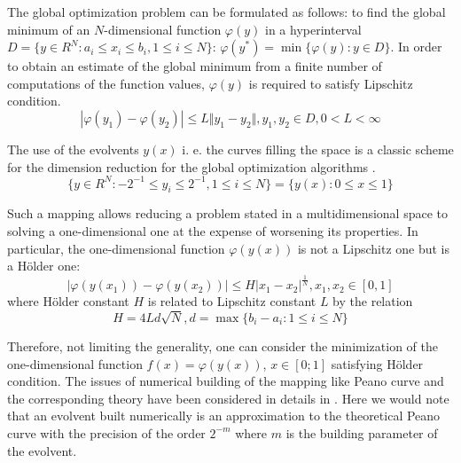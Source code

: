 \documentclass[procedia]{easychair}
\begin{document}
The global optimization problem can be formulated as follows:
to find the global minimum of an \(N\)-dimensional function \(\varphi(y)\) in a hyperinterval
\(D=\{y\in R^N:a_i\leqslant x_i\leqslant{b_i}, 1\leqslant{i}\leqslant{N}\}\): \(\varphi(y^*)=\min\{\varphi(y):y\in D\}\).
In order to obtain an estimate of the global minimum from a finite number of computations
of the function values, \(\varphi(y)\) is required to satisfy Lipschitz condition.
\begin{displaymath}
\label{lip}
|\varphi(y_1)-\varphi(y_2)|\leqslant L\Vert y_1-y_2\Vert,y_1,y_2\in D,0<L<\infty
\end{displaymath}
\par
The use of the evolvents \(y(x)\) i. e. the curves filling the space is a classic scheme
for the dimension reduction for the global optimization algorithms \cite{strOptBook}.
\begin{displaymath}
\label{cube}
\lbrace y\in R^N:-2^{-1}\leqslant y_i\leqslant 2^{-1},1\leqslant i\leqslant N\rbrace=\{y(x):0\leqslant x\leqslant 1\}
\end{displaymath}
\par
Such a mapping allows reducing a problem stated in a multidimensional space to solving
a one-dimensional one at the expense of worsening its properties. In particular,
the one-dimensional function \(\varphi(y(x))\) is not a Lipschitz one but is a Hölder one:
\begin{displaymath}
\label{holder}
|\varphi(y(x_1))-\varphi(y(x_2))|\leqslant H{|x_1-x_2|}^{\frac{1}{N}},x_1,x_2\in[0,1]
\end{displaymath}
where Hölder constant \(H\) is related to Lipschitz constant \(L\) by the relation
\begin{displaymath}
H=4Ld\sqrt{N},d=\max\{b_i-a_i:1\leqslant i\leqslant N\}
\end{displaymath}
\par
Therefore, not limiting the generality, one can consider the minimization of the
one-dimensional function \(f(x)=\varphi(y(x))\), \(x\in[0;1]\) satisfying Hölder condition.
The issues of numerical building of the mapping like Peano curve and the corresponding
theory have been considered in details in \cite{strOptBook}. Here we would note that an evolvent
built numerically is an approximation to the theoretical Peano curve with the precision
of the order \(2^{-m}\) where \(m\) is the building parameter of the evolvent.

\end{document}
